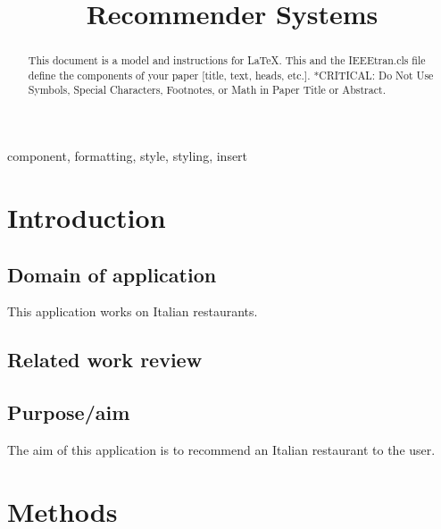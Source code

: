 \documentclass[conference]{IEEEtran}
\begin{document}
\title{Recommender Systems}

\author{

}

\maketitle

\begin{abstract}
    This document is a model and instructions for \LaTeX.
    This and the IEEEtran.cls file define the components of your paper [title, text, heads, etc.]. *CRITICAL: Do Not Use Symbols, Special Characters, Footnotes,
    or Math in Paper Title or Abstract.
\end{abstract}

\begin{IEEEkeywords}
    component, formatting, style, styling, insert
\end{IEEEkeywords}

\section{Introduction}

\subsection{Domain of application}

This application works on Italian restaurants.

\subsection{Related work review}

\subsection{Purpose/aim}

The aim of this application is to recommend an Italian restaurant to the user.


\section{Methods}
\end{document}
